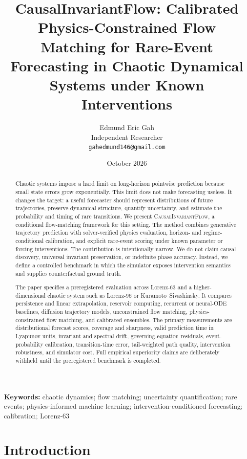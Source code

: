 \documentclass[11pt]{article}
\title{CausalInvariantFlow: Calibrated Physics-Constrained Flow Matching for Rare-Event Forecasting in Chaotic Dynamical Systems under Known Interventions}
\author{Edmund Eric Gah\\Independent Researcher\\\texttt{gahedmund146@gmail.com}}
\date{October 2026}
\newcommand{\method}{\textsc{CausalInvariantFlow}}
\begin{document}
\maketitle

\begin{abstract}
Chaotic systems impose a hard limit on long-horizon pointwise prediction because small state errors grow exponentially. This limit does not make forecasting useless. It changes the target: a useful forecaster should represent distributions of future trajectories, preserve dynamical structure, quantify uncertainty, and estimate the probability and timing of rare transitions. We present \method{}, a conditional flow-matching framework for this setting. The method combines generative trajectory prediction with solver-verified physics evaluation, horizon- and regime-conditional calibration, and explicit rare-event scoring under known parameter or forcing interventions. The contribution is intentionally narrow. We do not claim causal discovery, universal invariant preservation, or indefinite phase accuracy. Instead, we define a controlled benchmark in which the simulator exposes intervention semantics and supplies counterfactual ground truth.

The paper specifies a preregistered evaluation across Lorenz-63 and a higher-dimensional chaotic system such as Lorenz-96 or Kuramoto--Sivashinsky. It compares persistence and linear extrapolation, reservoir computing, recurrent or neural-ODE baselines, diffusion trajectory models, unconstrained flow matching, physics-constrained flow matching, and calibrated ensembles. The primary measurements are distributional forecast scores, coverage and sharpness, valid prediction time in Lyapunov units, invariant and spectral drift, governing-equation residuals, event-probability calibration, transition-time error, tail-weighted path quality, intervention robustness, and simulator cost. Full empirical superiority claims are deliberately withheld until the preregistered benchmark is completed.
\end{abstract}

\textbf{Keywords:} chaotic dynamics; flow matching; uncertainty quantification; rare events; physics-informed machine learning; intervention-conditioned forecasting; calibration; Lorenz-63

\section{Introduction}
\end{document}
